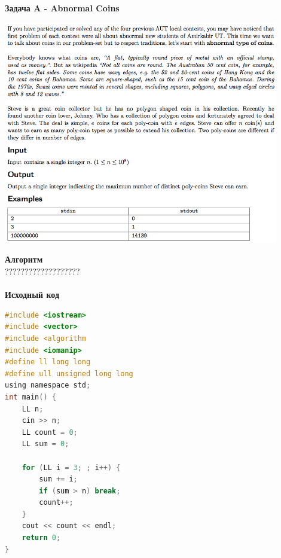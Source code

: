 \documentclass[a4paper,12pt]{article}
\begin{document}
\textbf{{\large Задача A - Abnormal Coins}} \\
\begin{center}
\includegraphics[width=0.9\textwidth]{CT_S02E10/CT_S02E10_A.png}\\ [1cm]
\end{center}
\textbf{{\large Алгоритм}} \\
{\Huge ???????????????????} \\ 
\\
\textbf{{\large Исходный код}}
\begin{lstlisting}[language=C]
#include <iostream>
#include <vector>
#include <algorithm
#include <iomanip>
#define ll long long
#define ull unsigned long long
using namespace std;
int main() {
    LL n;
    cin >> n;
    LL count = 0;
    LL sum = 0;
    
    for (LL i = 3; ; i++) {
        sum += i;
        if (sum > n) break;
        count++;
    }
    cout << count << endl;
    return 0;
}
\end{lstlisting}
\end{document}
